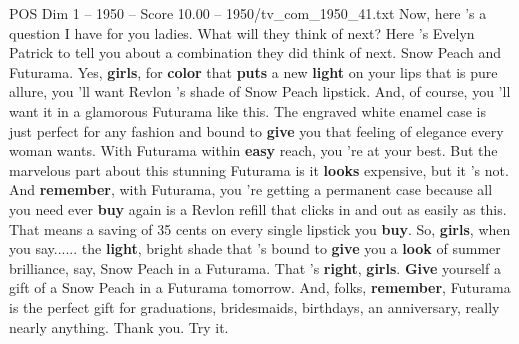 \begin{textsample}{POS Dim 1 – 1950 – Score 10.00 – 1950/tv\_com\_1950\_41.txt}  \label{ex:f1_pos_006}
Now, here 's a question I have for you ladies.
What will they think of next?
Here 's Evelyn Patrick to tell you about a combination they did think of next.
Snow Peach and Futurama.
Yes, \textbf{girls}, for \textbf{color} that \textbf{puts} a new \textbf{light} on your lips that is pure allure, you 'll want Revlon 's shade of Snow Peach lipstick.
And, of course, you 'll want it in a glamorous Futurama like this.
The engraved white enamel case is just perfect for any fashion and bound to \textbf{give} you that feeling of elegance every woman wants.
With Futurama within \textbf{easy} reach, you 're at your best.
But the marvelous part about this stunning Futurama is it \textbf{looks} expensive, but it 's not.
And \textbf{remember}, with Futurama, you 're getting a permanent case because all you need ever \textbf{buy} again is a Revlon refill that clicks in and out as easily as this.
That means a saving of 35 cents on every single lipstick you \textbf{buy}.
So, \textbf{girls}, when you say...... the \textbf{light}, bright shade that 's bound to \textbf{give} you a \textbf{look} of summer brilliance, say, Snow Peach in a Futurama.
That 's \textbf{right}, \textbf{girls}. \textbf{Give} yourself a gift of a Snow Peach in a Futurama tomorrow.
And, folks, \textbf{remember}, Futurama is the perfect gift for graduations, bridesmaids, birthdays, an anniversary, really nearly anything.
Thank you.
Try it.

\end{textsample}
